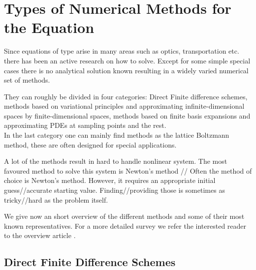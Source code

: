 \section{Types of Numerical Methods for the \MA Equation}
Since equations of \MA type arise in many areas such as optics, transportation etc. there has been an active research on how to solve. Except for some simple special cases there is no analytical solution known resulting in a widely varied numerical set of methods.

They can roughly be divided in four categories: Direct Finite difference schemes, methods based on variational principles and approximating infinite-dimensional spaces by finite-dimensional spaces, methods based on finite basis expansions and approximating PDEs at sampling points and the rest. \\
In the last category one can mainly find methods as the lattice Boltzmann method, these are often designed for special applications.

A lot of the methods result in hard to handle nonlinear system. The most favoured method to solve this system is Newton's method // Often the method of choice is Newton's method. However, it requires an appropriate initial guess//accurate starting value. Finding//providing those is sometimes as tricky//hard as the problem itself.

We give now an short overview of the different methods and some of their most known representatives. For a more detailed survey we refer the interested reader to the overview article \cite[Section 2.1]{FGN2013}.


\subsection{Direct Finite Difference Schemes}

